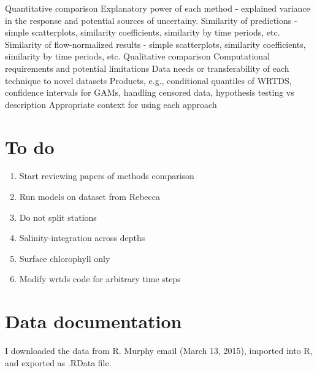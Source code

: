 \documentclass[letterpaper,12pt]{article}\usepackage[]{graphicx}\usepackage[]{color}
\begin{document}
\begin{outline}
\2 Quantitative comparison
\3 Explanatory power of each method - explained variance in the response and potential sources of uncertainy.
\3 Similarity of predictions - simple scatterplots, similarity coefficients, similarity by time periods, etc.
\3 Similarity of flow-normalized results - simple scatterplots, similarity coefficients, similarity by time periods, etc.
\2 Qualitative comparison
\3 Computational requirements and potential limitations
\3 Data needs or transferability of each technique to novel datasets
\3 Products, e.g., conditional quantiles of \ac{WRTDS}, confidence intervals for \acp{GAM}, handling censored data, hypothesis testing vs description
\3 Appropriate context for using each approach
\end{outline}

\section{To do}
\begin{enumerate}
\item Start reviewing papers of methods comparison
\item Run models on dataset from Rebecca
\item Do not split stations
\item Salinity-integration across depths
\item Surface chlorophyll only
\item Modify wrtds code for arbitrary time steps
\end{enumerate}

\section{Data documentation}
I downloaded the data from R. Murphy email (March 13, 2015), imported into R, and exported as .RData file. 
\end{document}
